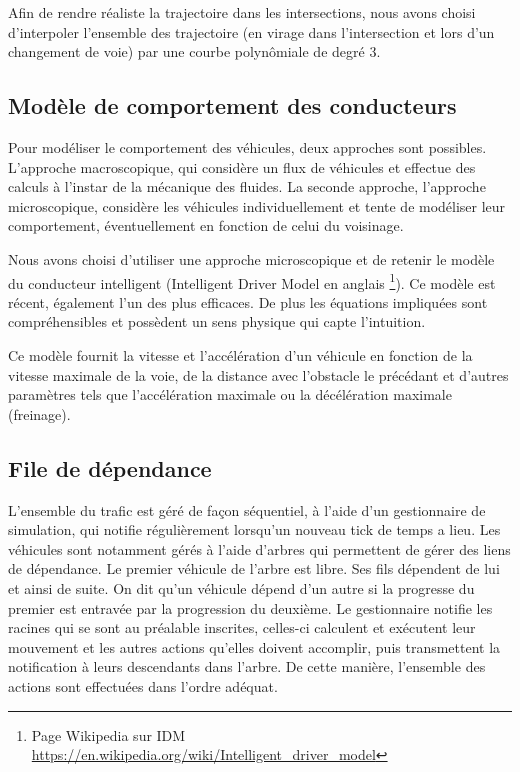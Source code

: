 \documentclass[11pt]{article}
\begin{document}
Afin de rendre réaliste la trajectoire dans les intersections, nous avons choisi d'interpoler l'ensemble des trajectoire (en virage dans l'intersection et lors d'un changement de voie) par une courbe polynômiale de degré 3.

\subsection{Modèle de comportement des conducteurs}
Pour modéliser le comportement des véhicules, deux approches sont possibles. L'approche macroscopique, qui considère un flux de véhicules et effectue des calculs à l'instar de la mécanique des fluides. La seconde approche, l'approche microscopique, considère les véhicules individuellement et tente de modéliser leur comportement, éventuellement en fonction de celui du voisinage. 

Nous avons choisi d'utiliser une approche microscopique et de retenir le modèle du conducteur intelligent (Intelligent Driver Model en anglais \footnote{Page Wikipedia sur IDM \url{https://en.wikipedia.org/wiki/Intelligent_driver_model}}). Ce modèle est récent, également l'un des plus efficaces. De plus les équations impliquées sont compréhensibles et possèdent un sens physique qui capte l'intuition.

Ce modèle fournit la vitesse et l'accélération d'un véhicule en fonction de la vitesse maximale de la voie, de la distance avec l'obstacle le précédant et d'autres paramètres tels que l'accélération maximale ou la décélération maximale (freinage).

\subsection{File de dépendance}
L'ensemble du trafic est géré de façon séquentiel, à l'aide d'un gestionnaire de simulation, qui notifie régulièrement lorsqu'un nouveau \og tick \fg de temps a lieu. Les véhicules sont notamment gérés à l'aide d'arbres qui permettent de gérer des liens de dépendance. Le premier véhicule de l'arbre est libre. Ses fils dépendent de lui et ainsi de suite. On dit qu'un véhicule dépend d'un autre si la progresse du premier est entravée par la progression du deuxième. Le gestionnaire notifie les racines qui se sont au préalable inscrites, celles-ci calculent et exécutent leur mouvement et les autres actions qu'elles doivent accomplir, puis transmettent la notification à leurs descendants dans l'arbre.  De cette manière, l'ensemble des actions sont effectuées dans l'ordre adéquat.
\end{document}
